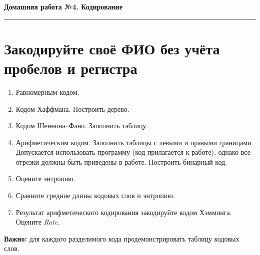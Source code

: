 \documentclass[a4paper,12pt,oneside]{article}
\newcommand{\Task}[1]{\section*{\normalfont\bfseries #1}}
\begin{document}
\begin{center}
    {\Large\bfseries Домашняя работа №4. Кодирование}\\[2mm]
\end{center}
\vspace{2mm}
\hrule
\vspace{4mm}

\Task{Закодируйте своё ФИО без учёта пробелов и регистра}

\begin{enumerate}[label=\arabic*.]
\item Равномерным кодом.
\item Кодом Хаффмана. Построить дерево.
\item Кодом Шеннона--Фано. Заполнить таблицу.
\item Арифметическим кодом. Заполнить таблицы с левыми и правыми границами. Допускается использовать программу (код прилагается к работе), однако все отрезки должны быть приведены в работе. Построить бинарный код.
\item Оцените энтропию.
\item Сравните средние длины кодовых слов и энтропию.
\item Результат арифметического кодирования закодируйте кодом Хэмминга. Оцените \textit{Rate}.
\end{enumerate}

\bigskip

\textbf{Важно:} для каждого разделимого кода продемонстрировать таблицу кодовых слов.
\end{document}
